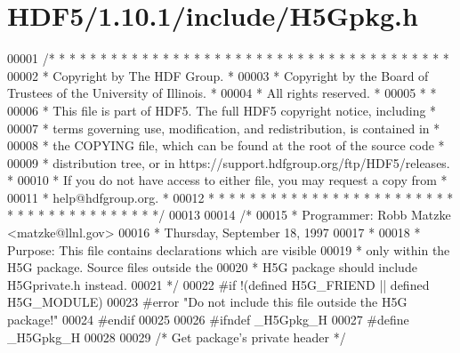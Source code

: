 \hypertarget{_h_d_f5_21_810_81_2include_2_h5_gpkg_8h_source}{}\section{H\+D\+F5/1.10.1/include/\+H5\+Gpkg.h}
\label{_h_d_f5_21_810_81_2include_2_h5_gpkg_8h_source}

\begin{DoxyCode}
00001 \textcolor{comment}{/* * * * * * * * * * * * * * * * * * * * * * * * * * * * * * * * * * * * * * *}
00002 \textcolor{comment}{ * Copyright by The HDF Group.                                               *}
00003 \textcolor{comment}{ * Copyright by the Board of Trustees of the University of Illinois.         *}
00004 \textcolor{comment}{ * All rights reserved.                                                      *}
00005 \textcolor{comment}{ *                                                                           *}
00006 \textcolor{comment}{ * This file is part of HDF5.  The full HDF5 copyright notice, including     *}
00007 \textcolor{comment}{ * terms governing use, modification, and redistribution, is contained in    *}
00008 \textcolor{comment}{ * the COPYING file, which can be found at the root of the source code       *}
00009 \textcolor{comment}{ * distribution tree, or in https://support.hdfgroup.org/ftp/HDF5/releases.  *}
00010 \textcolor{comment}{ * If you do not have access to either file, you may request a copy from     *}
00011 \textcolor{comment}{ * help@hdfgroup.org.                                                        *}
00012 \textcolor{comment}{ * * * * * * * * * * * * * * * * * * * * * * * * * * * * * * * * * * * * * * */}
00013 
00014 \textcolor{comment}{/*}
00015 \textcolor{comment}{ * Programmer: Robb Matzke <matzke@llnl.gov>}
00016 \textcolor{comment}{ *             Thursday, September 18, 1997}
00017 \textcolor{comment}{ *}
00018 \textcolor{comment}{ * Purpose:     This file contains declarations which are visible}
00019 \textcolor{comment}{ *              only within the H5G package. Source files outside the}
00020 \textcolor{comment}{ *              H5G package should include H5Gprivate.h instead.}
00021 \textcolor{comment}{ */}
00022 \textcolor{preprocessor}{#if !(defined H5G\_FRIEND || defined H5G\_MODULE)}
00023 \textcolor{preprocessor}{#error "Do not include this file outside the H5G package!"}
00024 \textcolor{preprocessor}{#endif}
00025 
00026 \textcolor{preprocessor}{#ifndef \_H5Gpkg\_H}
00027 \textcolor{preprocessor}{#define \_H5Gpkg\_H}
00028 
00029 \textcolor{comment}{/* Get package's private header */}

\end{DoxyCode}
